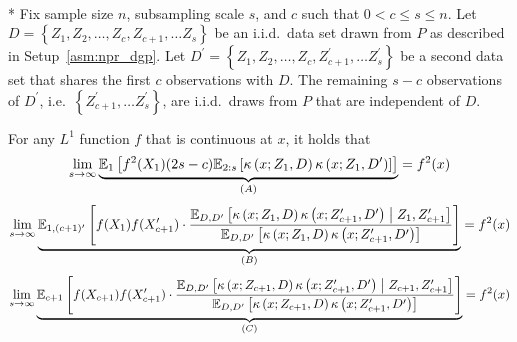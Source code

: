 \newpage

\begin{lem}[]\label{lem:kernel_prod_dirac_convergence}\mbox{}\\*
    Fix sample size $n$, subsampling scale $s$, and $c$ such that $0 < c \leq s \leq n$.
	Let $D = \left\{Z_1, Z_2, \dotsc, Z_c, Z_{c+1}, \dotsc Z_s \right\}$ be an i.i.d.\ data set drawn from $P$ as described in Setup~\ref{asm:npr_dgp}.
	Let $D^{\prime} = \left\{Z_1, Z_2, \dotsc, Z_c, Z_{c+1}^{\prime}, \dotsc Z_s^{\prime} \right\}$ be a second data set that shares the first $c$ observations with $D$.
	The remaining $s - c$ observations of $D^{\prime}$, i.e.\ $\left\{Z_{c+1}^{\prime}, \dotsc Z_s^{\prime} \right\}$, are i.i.d.\ draws from $P$ that are independent of $D$.

    For any $L^1$ function $f$ that is continuous at $x$, it holds that
    \begin{equation}
        \lim_{s \rightarrow \infty} \underbrace{\mathbb{E}_{1}\left[f^{2}(X_{1}) (2s - c) 
            \mathbb{E}_{2:s}\left[\kappa\left(x; Z_{1}, D\right)\kappa\left(x; Z_{1}, D^{\prime}\right)\right]
        \right]}_{(A)}
        = f^{2}(x)
    \end{equation}
    \begin{equation}
        \lim_{s \rightarrow \infty} \underbrace{\mathbb{E}_{1, (c+1)^{\prime}}\left[
            f(X_{1}) f(X_{c+1}^{\prime})
            \cdot \frac{\mathbb{E}_{D, D^{\prime}}\left[\kappa\left(x; Z_{1}, D\right)\kappa\left(x; Z_{c+1}^{\prime}, D^{\prime}\right) \; \middle| \; Z_{1}, Z_{c+1}^{\prime}\right]}{\mathbb{E}_{D, D^{\prime}}\left[\kappa\left(x; Z_{1}, D\right)\kappa\left(x; Z_{c+1}^{\prime}, D^{\prime}\right)\right]}
        \right]}_{(B)}
        = f^{2}(x)
    \end{equation}
    \begin{equation}
        \lim_{s \rightarrow \infty} \underbrace{\mathbb{E}_{c+1}\left[
            f(X_{c+1}) f(X_{c+1}^{\prime})
            \cdot \frac{\mathbb{E}_{D, D^{\prime}}\left[\kappa\left(x; Z_{c+1}, D\right)\kappa\left(x; Z_{c+1}^{\prime}, D^{\prime}\right) \; \middle| \; Z_{c+1}, Z_{c+1}^{\prime}\right]}{\mathbb{E}_{D, D^{\prime}}\left[\kappa\left(x; Z_{c+1}, D\right)\kappa\left(x; Z_{c+1}^{\prime}, D^{\prime}\right)\right]} 
        \right]}_{(C)}
        = f^{2}(x)
    \end{equation}
\end{lem}

